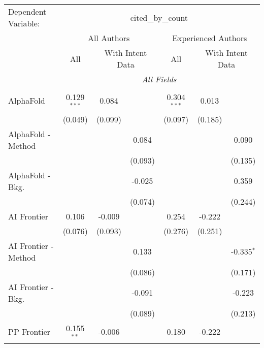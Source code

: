 \begingroup
\centering
\begin{tabular}{lcccccc}
   \tabularnewline \midrule \midrule
   Dependent Variable: & \multicolumn{6}{c}{cited\_by\_count}\\
 & \multicolumn{3}{c}{All Authors} & \multicolumn{3}{c}{Experienced Authors} \\
\cmidrule(lr){2-4} \cmidrule(lr){5-7}
 & \multicolumn{1}{c}{All} & \multicolumn{2}{c}{With Intent Data} & \multicolumn{1}{c}{All} & \multicolumn{2}{c}{With Intent Data} \\
\cmidrule(lr){2-2} \cmidrule(lr){3-4} \cmidrule(lr){5-5} \cmidrule(lr){6-7}
 & \multicolumn{6}{c}{\textit{All Fields}} \\ \\
   AlphaFold            & 0.129$^{***}$ & 0.084   &               & 0.304$^{***}$ & 0.013         &   \\   
                        & (0.049)       & (0.099) &               & (0.097)       & (0.185)       &   \\   
   AlphaFold - Method   &               &         & 0.084         &               &               & 0.090\\   
                        &               &         & (0.093)       &               &               & (0.135)\\   
   AlphaFold - Bkg.     &               &         & -0.025        &               &               & 0.359\\   
                        &               &         & (0.074)       &               &               & (0.244)\\   
   AI Frontier          & 0.106         & -0.009  &               & 0.254         & -0.222        &   \\   
                        & (0.076)       & (0.093) &               & (0.276)       & (0.251)       &   \\   
   AI Frontier - Method &               &         & 0.133         &               &               & -0.335$^{*}$\\   
                        &               &         & (0.086)       &               &               & (0.171)\\   
   AI Frontier - Bkg.   &               &         & -0.091        &               &               & -0.223\\   
                        &               &         & (0.089)       &               &               & (0.213)\\   
   PP Frontier          & 0.155$^{**}$  & -0.006  &               & 0.180         & -0.222        &   \\   

\end{tabular}
